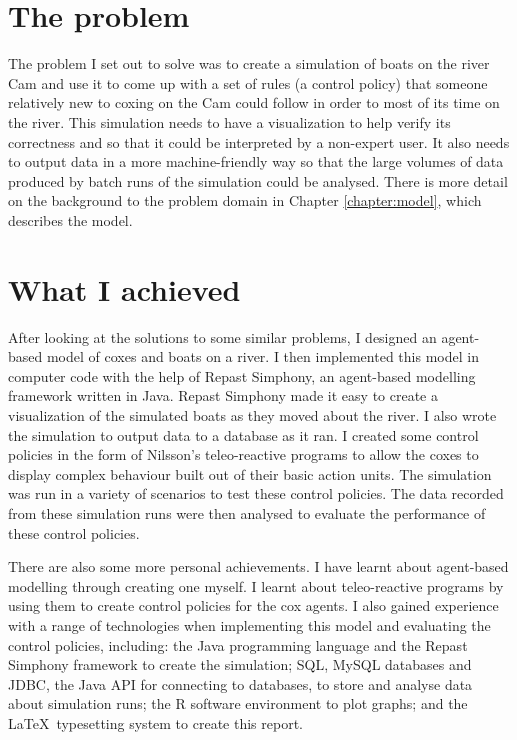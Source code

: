   \section{The problem}
  The problem I set out to solve was to create a simulation of boats on the river Cam and use it to come up with a set of rules (a control policy) that someone relatively new to coxing on the Cam could follow in order to most of its time on the river. This simulation needs to have a visualization to help verify its correctness and so that it could be interpreted by a non-expert user. It also needs to output data in a more machine-friendly way so that the large volumes of data produced by batch runs of the simulation could be analysed. There is more detail on the background to the problem domain in Chapter \ref{chapter:model}, which describes the model.
  
  \section{What I achieved}
  After looking at the solutions to some similar problems, I designed an agent-based model of coxes and boats on a river. I then implemented this model in computer code with the help of Repast Simphony, an agent-based modelling framework written in Java. Repast Simphony made it easy to create a visualization of the simulated boats as they moved about the river. I also wrote the simulation to output data to a database as it ran. I created some control policies in the form of Nilsson's teleo-reactive programs \cite{Nilsson1994} to allow the coxes to display complex behaviour built out of their basic action units. The simulation was run in a variety of scenarios to test these control policies. The data recorded from these simulation runs were then analysed to evaluate the performance of these control policies.
  
  There are also some more personal achievements. I have learnt about agent-based modelling through creating one myself. I learnt about teleo-reactive programs by using them to create control policies for the cox agents. I also gained experience with a range of technologies when implementing this model and evaluating the control policies, including: the Java programming language and the Repast Simphony framework to create the simulation; SQL, MySQL databases and JDBC, the Java API for connecting to databases, to store and analyse data about simulation runs; the R software environment to plot graphs; and the \LaTeX\ typesetting system to create this report.
  
